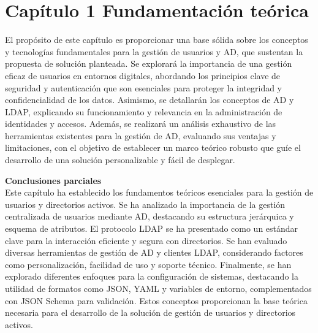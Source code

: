 \section{Capítulo 1 Fundamentación teórica}

El propósito de este capítulo es proporcionar una base sólida sobre los conceptos y tecnologías fundamentales para la gestión de usuarios y AD, que sustentan la propuesta de solución planteada. Se explorará la importancia de una gestión eficaz de usuarios en entornos digitales, abordando los principios clave de seguridad y autenticación que son esenciales para proteger la integridad y confidencialidad de los datos. Asimismo, se detallarán los conceptos de AD y LDAP, explicando su funcionamiento y relevancia en la administración de identidades y accesos. Además, se realizará un análisis exhaustivo de las herramientas existentes para la gestión de AD, evaluando sus ventajas y limitaciones, con el objetivo de establecer un marco teórico robusto que guíe el desarrollo de una solución personalizable y fácil de desplegar.






\textbf{Conclusiones parciales}\\
Este capítulo ha establecido los fundamentos teóricos esenciales para la gestión de usuarios y directorios activos. Se ha analizado la importancia de la gestión centralizada de usuarios mediante AD, destacando su estructura jerárquica y esquema de atributos. El protocolo LDAP se ha presentado como un estándar clave para la interacción eficiente y segura con directorios. Se han evaluado diversas herramientas de gestión de AD y clientes LDAP, considerando factores como personalización, facilidad de uso y soporte técnico. Finalmente, se han explorado diferentes enfoques para la configuración de sistemas, destacando la utilidad de formatos como JSON, YAML y variables de entorno, complementados con JSON Schema para validación. Estos conceptos proporcionan la base teórica necesaria para el desarrollo de la solución de gestión de usuarios y directorios activos.
